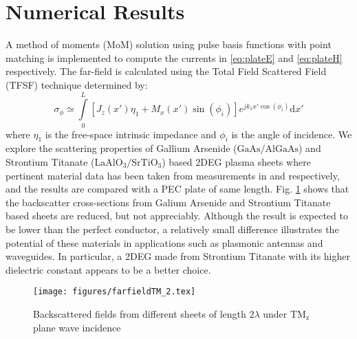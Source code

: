 \documentclass[conference, 10pt]{IEEEtran}
\renewcommand{\^}{\hat}  %
\begin{document}
\section{Numerical Results}
%
A method of moments (MoM) solution using pulse basis functions with point matching is implemented to compute the currents in \eqref{eq:plateE} and \eqref{eq:plateH} respectively. The far-field is calculated using the Total Field Scattered Field (TFSF) technique determined by:
\begin{equation}
  \sigma_{\phi} \simeq \int \limits_{0}^{L} \left[J_z(x')\eta_1 + M_x(x')\sin(\phi_i)\right] e^{j k_1 x' \cos(\phi_i)} \mathrm{d}x'
  \label{eq:far-field}
\end{equation}
where $\eta_1$ is the free-space intrinsic impedance and $\phi_i$ is the angle of incidence.
%
We explore the scattering properties of Gallium Arsenide ($\mathrm{GaAs}/\mathrm{AlGaAs}$) and Strontium Titanate ($\mathrm{LaAlO_3}/\mathrm{SrTiO_3}$) based 2DEG plasma sheets where pertinent material data has been taken from measurements in \cite{burke2000high} and \cite{herranz2012high} respectively, and the results are compared with a PEC plate of same length. Fig. \ref{fig:rcs} shows that the backscatter cross-sections from Galium Arsenide and Strontium Titanate based sheets are reduced, but not appreciably. Although the result is expected to be lower than the perfect conductor, a relatively small difference illustrates the potential of these materials in applications such as plasmonic antennas and waveguides. In particular, a 2DEG made from Strontium Titanate with its higher dielectric constant appears to be a better choice.
%
\begin{figure}[h]
  \begin{center}
    \noindent
    \texttt{[image: figures/farfieldTM\_2.tex]}
    \caption{Backscattered fields from different sheets of length $2\lambda$ under $\mathrm{TM_z}$ plane wave incidence}
    \label{fig:rcs}
  \end{center}
\end{figure}
%
\end{document}
